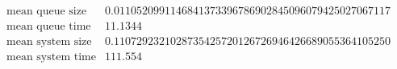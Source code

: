 \[\begin{array}{cc}
 \text{mean queue size} & 0.0110520991146841373396786902845096079425027067117 \\
 \text{mean queue time} & 11.1344 \\
 \text{mean system size} & 0.1107292321028735425720126726946426689055364105250 \\
 \text{mean system time} & 111.554 \\
\end{array}\]

